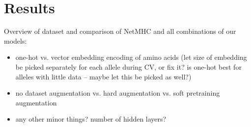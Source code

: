 \section*{Results}
Overview of dataset and comparison of NetMHC and all combinations of our models:
\begin{itemize}
\item one-hot vs. vector embedding encoding of amino acids (let size of embedding be picked separately for each allele during CV, or fix it? is one-hot best for alleles with little data -- maybe let this be picked as well?)
\item no dataset augmentation vs. hard augmentation vs. soft pretraining augmentation
\item any other minor things? number of hidden layers?
\end{itemize}

